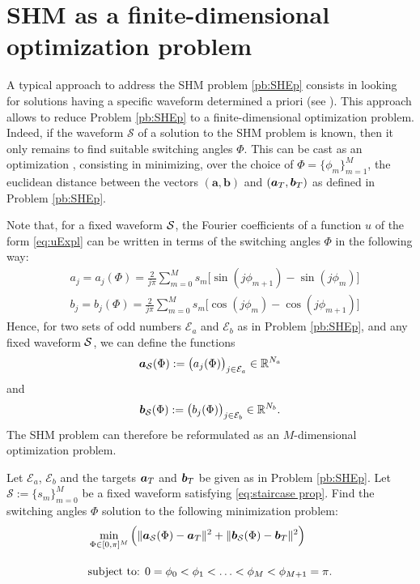 \documentclass[twocolumn]{autart}    %
\begin{document}
\section{SHM as a finite-dimensional optimization problem}\label{sec:SHE_finite-dim_pbm}

A typical approach to address the SHM problem \eqref{pb:SHEp} consists in looking for solutions having a specific waveform determined a priori (see \cite{Yang2015,Konstantinou2010,Sun1996}). This approach allows to reduce Problem \ref{pb:SHEp} to a finite-dimensional optimization problem.
Indeed, if the waveform $\mathcal S$ of a solution to the SHM problem is known,  then it only remains to find suitable switching angles $\Phi$. This can be cast as an optimization , consisting in minimizing, over the choice of $\Phi = \{\phi_m\}_{m=1}^{M}$, the euclidean distance between the  vectors $(\bm{a}, \bm{b})$ and $(\bm{a}_T,\bm{b}_T)$ as defined in Problem \ref{pb:SHEp}.

Note that, for a fixed waveform $\mathcal{S}$, the Fourier coefficients of a function $u$ of the form \eqref{eq:uExpl} can be written in terms of the switching angles $\Phi$ in the following way:
\begin{align*}
	& a_j = a_j(\Phi) =  \frac{2}{j\pi} \sum_{m=0}^{M} s_m \Big[\sin(j\phi_{m+1}) -\sin(j\phi_{m})\Big]
	\\[5pt]
	& b_j = b_j(\Phi) = \frac{2}{j\pi} \sum_{m=0}^{M} s_m \Big[\cos(j\phi_{m}) -\cos(j\phi_{m+1})\Big]
\end{align*}
Hence, for two sets of odd numbers $\mathcal{E}_a$ and $\mathcal{E}_b$ as in Problem \ref{pb:SHEp}, and any fixed waveform $\mathcal{S}$, we can define the functions
\begin{align*}
	\bm{a}_{\mathcal{S}} (\Phi) := \big(a_j (\Phi)\big)_{j\in \mathcal{E}_a} \in \mathbb{R}^{N_a}
\end{align*}
and
\begin{align*}
	\bm{b}_{\mathcal{S}} (\Phi) := \big(b_j (\Phi)\big)_{j\in \mathcal{E}_b} \in \mathbb{R}^{N_b}.
\end{align*}
The SHM problem can therefore be reformulated as an $M$-dimensional optimization problem.

\bigskip

\begin{problem}\label{pb:SHE opt}
Let $\mathcal{E}_a$, $\mathcal{E}_b$ and the targets $\bm{a}_T$ and $\bm{b}_T$ be given as in Problem \ref{pb:SHEp}.  Let $\mathcal S := \{ s_m\}_{m=0}^M$ be a fixed waveform satisfying \eqref{eq:staircase prop}.  Find the switching angles $\Phi$ solution to the following minimization problem:
\begin{align}
	&\min_{\Phi \in [0,\pi]^{M}} \Big( \|\bm{a}_{\mathcal{S}} (\Phi) - \bm{a}_T\|^2 + \| \bm{b}_{\mathcal{S}} (\Phi) - \bm{b}_T\|^2\Big)\notag 
	\\[10pt]
	&\mbox{subject to: } 0 = \phi_0 <\phi_1 < \ldots < \phi_{M} < \phi_{M+1} = \pi. \notag 
\end{align}
\end{problem}
\end{document}
